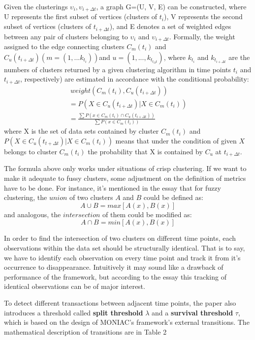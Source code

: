 \documentclass{sig-alternate}
\begin{document}
Given the clusterings $\upsilon_i, \upsilon_{i+\Delta t}$, a graph G=(U, V, E) can be constructed, where U represents the first subset of vertices (clusters of $t_i$), V represents the second subset of vertices (clusters of $t_{i+\Delta t}$), and E denotes a set of weighted edges between any pair of clusters belonging to $\upsilon_i$ and $\upsilon_{i+\Delta t}$. Formally, the weight assigned to the edge connecting clusters $C_m(t_i)$ and $C_u(t_{i+\Delta t})(m = (1,...k_{t_i}))$and $u = (1,...,k_{t_{t_\Delta t}})$, where $k_{t_i}$ and $k_{t_{i+\Delta t}}$ are the numbers of clusters returned by a given clustering algorithm in time points $t_i$ and $t_{i+\Delta t}$, respectively) are estimated in accordance with the conditional probability:
\begin{gather*}\
  weight(C_m(t_i), C_u(t_{i+\Delta t})) \\
   = P(X\in C_u(t_{i+\Delta t})|X\in C_m(t_i)) \\
   = \frac{\sum P(x\in C_m(t_i)\cap C_u(t_{i+\Delta t}))}{\sum P(x\in C_m(t_i))}
\end{gather*}
where X is the set of data sets contained by cluster $C_m(t_i)$ and $P(X\in C_u(t_{t+\Delta t})|X\in C_m(t_i))$ means that under the condition of given $X$ belongs to cluster $C_m(t_i)$ the probability that X is contained by $C_u$ at $t_{i+\Delta t}$.

The formula above only works under situations of crisp clustering. If we want to make it adequate to fussy clusters, some adjustment on the definition of metrics have to be done. For instance, it's mentioned in the essay that for fuzzy clustering, the $union$ of two clusters $A$ and $B$ could be defined as:
\begin{displaymath}
  A\cup B=max[A(x), B(x)]
\end{displaymath}
and analogous, the $intersection$ of them could be modified as:
\begin{displaymath}
  A\cap B=min[A(x),B(x)]
\end{displaymath}

In order to find the intersection of two clusters on different time points, each observations within the data set should be structurally identical. That is to say, we have to identify each observation on every time point and track it from it's occurrence to disappearance. Intuitively it may sound like a drawback of performance of the framework, but according to the essay this tracking of identical observations can be of major interest.

To detect different transactions between adjacent time points, the paper also introduces a threshold called \textbf{split threshold} $\lambda$ and a \textbf{survival threshold} $\tau$, which is based on the design of MONIAC's framework's external transitions\cite{SPILIOPOULOU:transition}. The mathematical description of transitions are in Table 2
\end{document}
